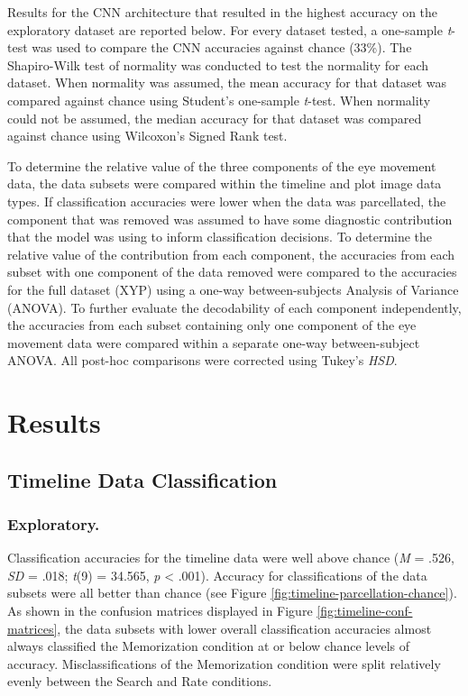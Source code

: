 \documentclass[
  english,
  man,floatsintext]{apa6}
\begin{document}
Results for the CNN architecture that resulted in the highest accuracy on the exploratory dataset are reported below. For every dataset tested, a one-sample \emph{t}-test was used to compare the CNN accuracies against chance (33\%). The Shapiro-Wilk test of normality was conducted to test the normality for each dataset. When normality was assumed, the mean accuracy for that dataset was compared against chance using Student's one-sample \emph{t}-test. When normality could not be assumed, the median accuracy for that dataset was compared against chance using Wilcoxon's Signed Rank test.

To determine the relative value of the three components of the eye movement data, the data subsets were compared within the timeline and plot image data types. If classification accuracies were lower when the data was parcellated, the component that was removed was assumed to have some diagnostic contribution that the model was using to inform classification decisions. To determine the relative value of the contribution from each component, the accuracies from each subset with one component of the data removed were compared to the accuracies for the full dataset (XYP) using a one-way between-subjects Analysis of Variance (ANOVA). To further evaluate the decodability of each component independently, the accuracies from each subset containing only one component of the eye movement data were compared within a separate one-way between-subject ANOVA. All post-hoc comparisons were corrected using Tukey's \emph{HSD}.

\section{Results}

\subsection{Timeline Data Classification}
\subsubsection{Exploratory.}

Classification accuracies for the timeline data were well above chance (\emph{M} = .526, \emph{SD} = .018; \emph{t}(9) = 34.565, \emph{p} \textless{} .001). Accuracy for classifications of the data subsets were all better than chance (see Figure \ref{fig:timeline-parcellation-chance}). As shown in the confusion matrices displayed in Figure \ref{fig:timeline-conf-matrices}, the data subsets with lower overall classification accuracies almost always classified the Memorization condition at or below chance levels of accuracy. Misclassifications of the Memorization condition were split relatively evenly between the Search and Rate conditions.
\end{document}
